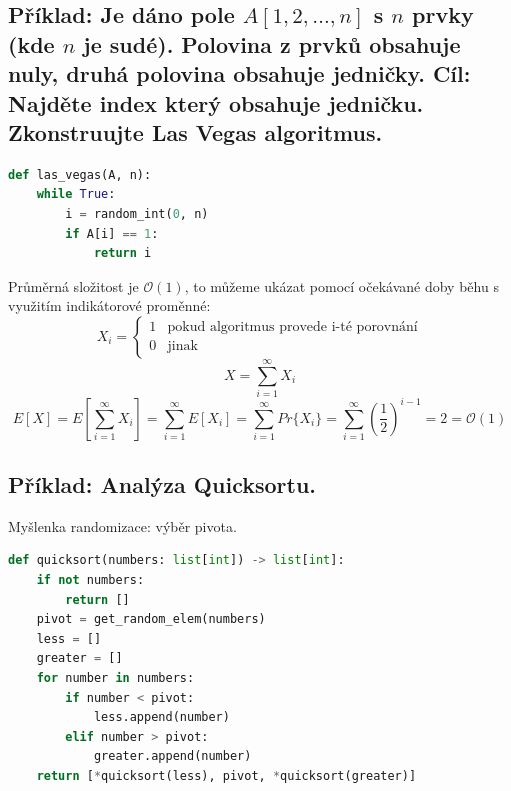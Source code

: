 \subsection{Příklad: Je dáno pole $A[1, 2, \dots, n]$ s $n$ prvky (kde $n$ je sudé). Polovina z prvků obsahuje nuly, druhá polovina obsahuje jedničky. Cíl: Najděte index který obsahuje jedničku. Zkonstruujte Las Vegas algoritmus.}

\bigskip\noindent\begin{minipage}{\linewidth}
    \begin{lstlisting}[language=Python, caption={Las Vegas algoritmus v Pythonu.}]
def las_vegas(A, n):
    while True:
        i = random_int(0, n)
        if A[i] == 1:
            return i
\end{lstlisting}
\end{minipage}

\begin{compactitem}
    \item Průměrná složitost je $\mathcal{O}(1)$, to můžeme ukázat pomocí očekávané doby běhu s využitím indikátorové proměnné:
    $$ X_i = \left\{
        \begin{array}{ll}
            1 & \text{pokud algoritmus provede i-té porovnání} \\
            0 & \text{jinak}
        \end{array}
        \right. $$
    $$ X = \sum_{i=1}^{\infty} X_i $$
    $$ E[X] = E \left[ \sum_{i=1}^{\infty} X_i \right] = \sum_{i=1}^{\infty} E \left[ X_i \right] = \sum_{i=1}^{\infty} Pr\{ X_i \} = \sum_{i=1}^{\infty} \left(\frac{1}{2}\right)^{i-1} = 2 = \mathcal{O}(1)$$
\end{compactitem}

\subsection{Příklad: Analýza Quicksortu.}

\begin{compactitem}
    \item Myšlenka randomizace: výběr pivota.
\end{compactitem}

\noindent\begin{minipage}{\linewidth}
    \begin{lstlisting}[language=Python, caption={Quicksort v Pythonu.}]
def quicksort(numbers: list[int]) -> list[int]:
    if not numbers:
        return []
    pivot = get_random_elem(numbers)
    less = []
    greater = []
    for number in numbers:
        if number < pivot:
            less.append(number)
        elif number > pivot:
            greater.append(number)
    return [*quicksort(less), pivot, *quicksort(greater)]
\end{lstlisting}
\end{minipage}

